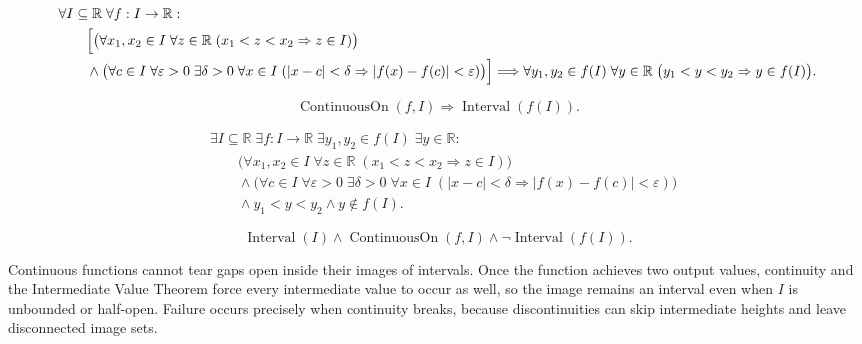 \begin{remark*}
\[
\begin{aligned}
&\forall I\subseteq\mathbb{R}\;\forall f:I\to\mathbb{R}:\\
&\qquad
\Bigl[
\bigl(\forall x_1,x_2\in I\;\forall z\in\mathbb{R}\;(x_1<z<x_2\Rightarrow z\in I)\bigr)\\
&\qquad\land
\bigl(\forall c\in I\;\forall \varepsilon>0\;\exists \delta>0\;\forall x\in I\;
(|x-c|<\delta\Rightarrow |f(x)-f(c)|<\varepsilon)\bigr)
\Bigr]
\Longrightarrow
\forall y_1,y_2 \in f(I)\; \forall y \in \mathbb{R}\;
\bigl(y_1 < y < y_2 \Rightarrow y \in f(I)\bigr).
\end{aligned}
\]
\end{remark*}

\begin{remark*}
\[
\operatorname{ContinuousOn}(f,I)
\Longrightarrow
\operatorname{Interval}(f(I)).
\]
\end{remark*}

\begin{remark*}
\[
\begin{aligned}
&\exists I\subseteq\mathbb{R}\;\exists f:I\to\mathbb{R}\;
\exists y_1,y_2\in f(I)\;\exists y\in\mathbb{R}:\\
&\qquad
\bigl(\forall x_1,x_2\in I\;\forall z\in\mathbb{R}\;(x_1<z<x_2\Rightarrow z\in I)\bigr)\\
&\qquad\land
\bigl(\forall c\in I\;\forall \varepsilon>0\;\exists \delta>0\;\forall x\in I\;
(|x-c|<\delta\Rightarrow |f(x)-f(c)|<\varepsilon)\bigr)\\
&\qquad\land
y_1<y<y_2
\land
y\notin f(I).
\end{aligned}
\]
\end{remark*}

\begin{remark*}
\[
\operatorname{Interval}(I)\land\operatorname{ContinuousOn}(f,I)
\land\neg\operatorname{Interval}(f(I)).
\]
\end{remark*}

\begin{remark*}[Interpretation]
Continuous functions cannot tear gaps open inside their images of intervals. Once the function achieves two output values, continuity and the Intermediate Value Theorem force every intermediate value to occur as well, so the image remains an interval even when $I$ is unbounded or half-open. Failure occurs precisely when continuity breaks, because discontinuities can skip intermediate heights and leave disconnected image sets.
\end{remark*}

